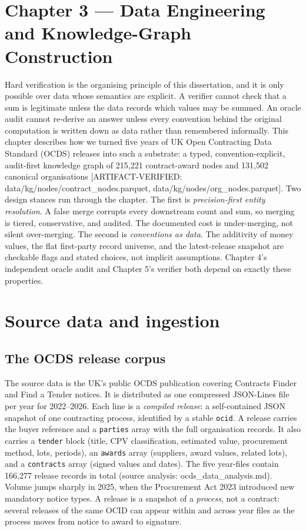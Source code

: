 \section{Chapter 3 --- Data Engineering and Knowledge-Graph Construction}\label{sec:chapter-3-data-engineering-and-knowledge}

Hard verification is the organising principle of this dissertation, and it is only possible over data whose semantics are explicit. A verifier cannot check that a sum is legitimate unless the data records which values may be summed. An oracle audit cannot re-derive an answer unless every convention behind the original computation is written down as data rather than remembered informally. This chapter describes how we turned five years of UK Open Contracting Data Standard (OCDS) releases into such a substrate: a typed, convention-explicit, audit-first knowledge graph of 215,221 contract-award nodes and 131,502 canonical organisations [ARTIFACT-VERIFIED: data/kg/nodes/contract\_nodes.parquet, data/kg/nodes/org\_nodes.parquet]. Two design stances run through the chapter. The first is \emph{precision-first entity resolution}. A false merge corrupts every downstream count and sum, so merging is tiered, conservative, and audited. The documented cost is under-merging, not silent over-merging. The second is \emph{conventions as data}. The additivity of money values, the flat first-party record universe, and the latest-release snapshot are checkable flags and stated choices, not implicit assumptions. Chapter 4's independent oracle audit and Chapter 5's verifier both depend on exactly these properties.

\section{Source data and ingestion}\label{sec:source-data-and-ingestion}

\subsection{The OCDS release corpus}\label{sec:the-ocds-release-corpus}

The source data is the UK's public OCDS publication covering Contracts Finder and Find a Tender notices. It is distributed as one compressed JSON-Lines file per year for 2022--2026. Each line is a \emph{compiled release}: a self-contained JSON snapshot of one contracting process, identified by a stable \texttt{ocid}. A release carries the buyer reference and a \texttt{parties} array with the full organisation records. It also carries a \texttt{tender} block (title, CPV classification, estimated value, procurement method, lots, periods), an \texttt{awards} array (suppliers, award values, related lots), and a \texttt{contracts} array (signed values and dates). The five year-files contain 166,277 release records in total (source analysis: ocds\_data\_analysis.md). Volume jumps sharply in 2025, when the Procurement Act 2023 introduced new mandatory notice types. A release is a snapshot of a \emph{process}, not a contract: several releases of the same OCID can appear within and across year files as the process moves from notice to award to signature.


